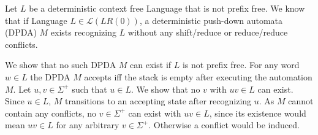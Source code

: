 Let $L$ be a deterministic context free Language that is not prefix free. We know that if Language $L \in \mathcal{L}(LR(0))$, a deterministic push-down automata (DPDA) $M$ exists recognizing $L$ without any shift/reduce or reduce/reduce conflicts.

We show that no such DPDA $M$ can exist if $L$ is not prefix free.
For any word $w \in L$ the DPDA $M$ accepts iff the stack is empty after executing the automation $M$. Let $u, v \in \Sigma^+$ such that $u \in L$. We show that no $v$ with $uv \in L$ can exist. Since $u \in L$, $M$ transitions to an accepting state after recognizing $u$. As $M$ cannot contain any conflicts, no $v \in \Sigma^+$ can exist with $uv \in L$, since its existence would mean $uv \in L$ for any arbitrary $v \in \Sigma^+$. Otherwise a conflict would be induced.